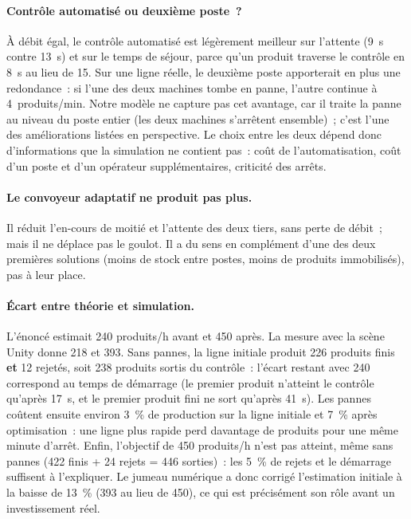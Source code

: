 \paragraph{Contrôle automatisé ou deuxième poste~?} À débit égal, le contrôle automatisé est légèrement meilleur sur l'attente (9~s contre 13~s) et sur le temps de séjour, parce qu'un produit traverse le contrôle en 8~s au lieu de 15. Sur une ligne réelle, le deuxième poste apporterait en plus une redondance~: si l'une des deux machines tombe en panne, l'autre continue à 4~produits/min. Notre modèle ne capture pas cet avantage, car il traite la panne au niveau du poste entier (les deux machines s'arrêtent ensemble)~; c'est l'une des améliorations listées en perspective. Le choix entre les deux dépend donc d'informations que la simulation ne contient pas~: coût de l'automatisation, coût d'un poste et d'un opérateur supplémentaires, criticité des arrêts.

\paragraph{Le convoyeur adaptatif ne produit pas plus.} Il réduit l'en-cours de moitié et l'attente des deux tiers, sans perte de débit~; mais il ne déplace pas le goulot. Il a du sens en complément d'une des deux premières solutions (moins de stock entre postes, moins de produits immobilisés), pas à leur place.

\paragraph{Écart entre théorie et simulation.} L'énoncé estimait 240 produits/h avant et 450 après. La mesure avec la scène Unity donne 218 et 393. Sans pannes, la ligne initiale produit 226 produits finis \textbf{et} 12 rejetés, soit 238 produits sortis du contrôle~: l'écart restant avec 240 correspond au temps de démarrage (le premier produit n'atteint le contrôle qu'après 17~s, et le premier produit fini ne sort qu'après 41~s). Les pannes coûtent ensuite environ 3~\% de production sur la ligne initiale et 7~\% après optimisation~: une ligne plus rapide perd davantage de produits pour une même minute d'arrêt. Enfin, l'objectif de 450 produits/h n'est pas atteint, même sans pannes (422 finis + 24 rejets = 446 sorties)~: les 5~\% de rejets et le démarrage suffisent à l'expliquer. Le jumeau numérique a donc corrigé l'estimation initiale à la baisse de 13~\% (393 au lieu de 450), ce qui est précisément son rôle avant un investissement réel.

